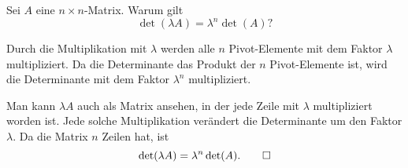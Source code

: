 Sei $A$ eine $n\times n$-Matrix. Warum gilt
\[
\det(\lambda A)=\lambda^n\det(A)?
\]

\begin{loesung}
Durch die Multiplikation mit $\lambda$ werden alle $n$ Pivot-Elemente mit dem
Faktor $\lambda$ multipliziert. Da die Determinante das Produkt der $n$ Pivot-Elemente
ist, wird die Determinante mit dem Faktor $\lambda^n$ multipliziert.

Man kann $\lambda A$ auch als Matrix ansehen, in der jede Zeile mit $\lambda$
multipliziert worden ist. Jede solche Multiplikation verändert die Determinante
um den Faktor $\lambda$. Da die Matrix $n$ Zeilen hat, ist
\[
\det(\lambda A)=\lambda^n \det(A).
\qedhere
\]
\end{loesung}
